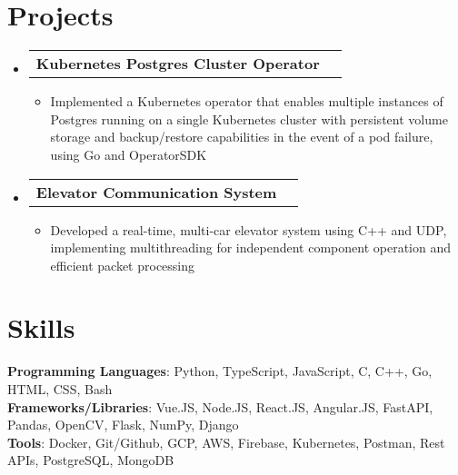 \documentclass[letterpaper,11pt]{article}
\makeatletter
\newcommand{\resumeItem}[1]{
  \item\small{
    {#1 \vspace{-2pt}}
  }
}
\newcommand{\resumeProjectHeading}[2]{
    \item
    \begin{tabular*}{0.97\textwidth}{l@{\extracolsep{\fill}}r}
      \small#1 & #2 \\
    \end{tabular*}\vspace{-7pt}
}
\newcommand{\resumeSubHeadingListStart}{\begin{itemize}[leftmargin=0.15in, label={}]}
\newcommand{\resumeSubHeadingListEnd}{\end{itemize}}
\newcommand{\resumeItemListStart}{\begin{itemize}}
\newcommand{\resumeItemListEnd}{\end{itemize}\vspace{-5pt}}
\makeatother
\begin{document}
\section{Projects}
    \resumeSubHeadingListStart
      \resumeProjectHeading
          {\textbf{Kubernetes Postgres Cluster Operator}}{} 
          \resumeItemListStart
            \resumeItem{Implemented a Kubernetes operator that enables multiple instances of Postgres running on a single Kubernetes cluster with persistent volume storage and backup/restore capabilities in the event of a pod failure, using Go and OperatorSDK}
          \resumeItemListEnd
      \resumeProjectHeading
          {\textbf{Elevator Communication System}}{}
          \resumeItemListStart
            \resumeItem{Developed a real-time, multi-car elevator system using C++ and UDP, implementing multithreading for independent component operation and efficient packet processing}
          \resumeItemListEnd
    \resumeSubHeadingListEnd


\section{Skills}
 \begin{itemize}[leftmargin=0.15in, label={}]
    \small{\item{
     \textbf{Programming Languages}{: Python, TypeScript, JavaScript, C, C++, Go, HTML, CSS, Bash} \\
     \textbf{Frameworks/Libraries}{: Vue.JS, Node.JS, React.JS, Angular.JS, FastAPI, Pandas, OpenCV, Flask, NumPy, Django} \\
     \textbf{Tools}{: Docker, Git/Github, GCP, AWS, Firebase, Kubernetes, Postman, Rest APIs, PostgreSQL, MongoDB}
    }}
 \end{itemize}


\end{document}
